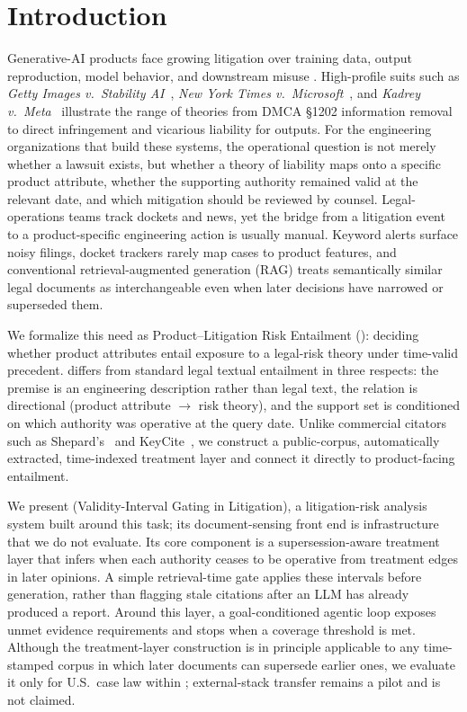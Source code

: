 \section{Introduction}
\label{sec:introduction}

Generative-AI products face growing litigation over training data, output reproduction, model behavior, and downstream misuse \citep{henderson2023foundation,levendowski2018copyright,grimmelmann2015copyright}.
High-profile suits such as \textit{Getty Images v.\ Stability AI}~\citep{getty_stability_2023}, \textit{New York Times v.\ Microsoft}~\citep{nyt_openai_2023}, and \textit{Kadrey v.\ Meta}~\citep{kadrey_meta_2023} illustrate the range of theories from DMCA §1202 information removal to direct infringement and vicarious liability for outputs.
For the engineering organizations that build these systems, the operational question is not merely whether a lawsuit exists, but whether a theory of liability maps onto a specific product attribute, whether the supporting authority remained valid at the relevant date, and which mitigation should be reviewed by counsel.
Legal-operations teams track dockets and news, yet the bridge from a litigation event to a product-specific engineering action is usually manual.
Keyword alerts surface noisy filings, docket trackers rarely map cases to product features, and conventional retrieval-augmented generation (RAG) \citep{lewis2020retrieval} treats semantically similar legal documents as interchangeable even when later decisions have narrowed or superseded them.

We formalize this need as Product--Litigation Risk Entailment (\plre): deciding whether product attributes entail exposure to a legal-risk theory under time-valid precedent.
\plre{} differs from standard legal textual entailment \citep{rabelo2022coliee} in three respects: the premise is an engineering description rather than legal text, the relation is directional (product attribute $\to$ risk theory), and the support set is conditioned on which authority was operative at the query date.
Unlike commercial citators such as Shepard's~\citep{shepards2024} and KeyCite~\citep{keycite2024}, we construct a public-corpus, automatically extracted, time-indexed treatment layer and connect it directly to product-facing entailment.

We present \sysname{} (Validity-Interval Gating in Litigation), a litigation-risk analysis system built around this task; its document-sensing front end is infrastructure that we do not evaluate.
Its core component is a supersession-aware treatment layer that infers when each authority ceases to be operative from treatment edges in later opinions.
A simple retrieval-time gate applies these intervals before generation, rather than flagging stale citations after an LLM has already produced a report.
Around this layer, a goal-conditioned agentic loop exposes unmet evidence requirements and stops when a coverage threshold is met.
Although the treatment-layer construction is in principle applicable to any time-stamped corpus in which later documents can supersede earlier ones, we evaluate it only for U.S.\ case law within \sysname{}; external-stack transfer remains a pilot and is not claimed.

